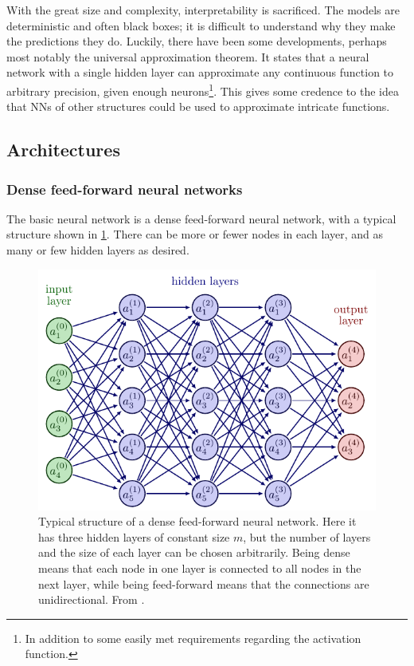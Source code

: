 With the great size and complexity, interpretability is sacrificed.
The models are deterministic and often black boxes; it is difficult to understand why they make the predictions they do.
Luckily, there have been some developments, perhaps most notably the universal approximation theorem.
It states that a neural network with a single hidden layer can approximate any continuous function to arbitrary precision, given enough neurons\footnote{In addition to some easily met requirements regarding the activation function.}.
This gives some credence to the idea that NNs of other structures could be used to approximate intricate functions.


\subsection{Architectures}
\subsubsection{Dense feed-forward neural networks}
The basic neural network is a dense feed-forward neural network, with a typical structure shown in \cref{fig:nn}.
There can be more or fewer nodes in each layer, and as many or few hidden layers as desired.

\begin{figure}
    \centering
    \includegraphics[width=0.7\linewidth, page=4]{neural_networks.pdf}
    \caption{
        Typical structure of a dense feed-forward neural network.
        Here it has three hidden layers of constant size $m$, but the number of layers and the size of each layer can be chosen arbitrarily.
        Being dense means that each node in one layer is connected to all nodes in the next layer, while being feed-forward means that the connections are unidirectional.
        From \cite{nn_figs}.
    }
    \label{fig:nn}
\end{figure}

